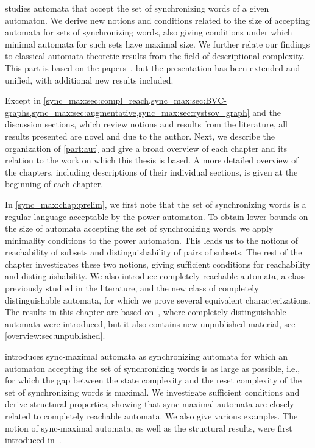 
 studies automata that accept the set of synchronizing words of a given automaton. 
We derive new notions and conditions related to the size of 
accepting automata for sets of synchronizing words, also giving conditions 
under which minimal automata for such sets have maximal size. 
We further relate our findings to classical automata-theoretic results 
from the field of descriptional complexity.
This part is based on the papers~\cite{DBLP:conf/lata/Hoffmann21,
	DBLP:journals/tcs/Hoffmann21,
	DBLP:conf/lata/Hoffmann21a,
	DBLP:conf/dcfs/Hoffmann21,
	DBLP:conf/dcfs/Hoffmann22,
	HoffmannCircularExtended,
	HoffmannLATAextended2,
	Hoffmann2024}, 
but the presentation has been extended and unified, with additional new results included.

Except in \cref{sync_max:sec:compl_reach,sync_max:sec:BVC-graphs,sync_max:sec:augmentative,sync_max:sec:rystsov_graph} and the discussion sections, which review notions and results from the literature, all results presented are novel and due to the author. Next, we describe the organization of \cref{part:aut} and give a broad overview of each chapter and its relation to the work on which this thesis is based. A more detailed overview of the chapters, including descriptions of their individual sections, is given at the beginning of each chapter.

In \cref{sync_max:chap:prelim}, we first note that the set of synchronizing words is a regular language acceptable by the power automaton.
To obtain lower bounds on the size of automata accepting the set of synchronizing words, we apply minimality conditions to the power automaton. This leads us to the notions of reachability of subsets and distinguishability of pairs of subsets.
The rest of the chapter investigates these two notions, giving sufficient conditions for reachability and distinguishability. We also introduce completely reachable automata, a class previously studied in the literature, and the new class of completely distinguishable automata, for which we prove several equivalent characterizations.
The results in this chapter are based on~\cite{DBLP:conf/dlt/Hoffmann23,Hoffmann2024}, where completely distinguishable automata were introduced, but it also contains new unpublished material, see \cref{overview:sec:unpublished}.

 introduces sync-maximal automata as synchronizing automata for which an automaton accepting the set of synchronizing words is as large as possible, i.e., for which the gap between the state complexity and the reset complexity of the set of synchronizing words is maximal. We investigate sufficient conditions and derive structural properties, showing that sync-maximal automata are closely related to completely reachable automata. We also give various examples. The notion of sync-maximal automata, as well as the structural results, were first introduced in~\cite{DBLP:conf/dlt/Hoffmann23,Hoffmann2024}. 


